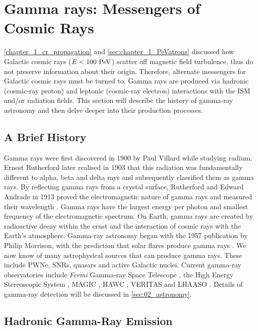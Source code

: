 \section{Gamma rays: Messengers of Cosmic Rays} \label
{sec:chapter1_non_thermal_emission}
\autoref{chapter_1_cr_propagation} and \autoref{sec:chapter_1_PeVatrons} discussed how Galactic cosmic rays ($E<100~\PeV$) scatter off magnetic field turbulence, thus do not preserve information about their origin. Therefore, alternate messengers for Galactic cosmic rays must be turned to. Gamma rays are produced via hadronic (cosmic-ray proton) and leptonic (cosmic-ray electron) interactions with the ISM and/or radiation fields. This section will describe the history of gamma-ray astronomy and then delve deeper into their production processes.

\subsection{A Brief History}

Gamma rays were first discovered in 1900 by Paul Villard while studying radium. Ernest Rutherford later realised in 1903 that this radiation was fundamentally different to alpha, beta and delta rays and subsequently classified them as gamma rays. By reflecting gamma rays from a crystal surface, Rutherford and Edward Andrade in 1913 proved the electromagnetic nature of gamma rays and measured their wavelength \citep{1913Natur..92..267R}. Gamma rays have the largest energy per photon and smallest frequency of the electromagnetic spectrum. On Earth, gamma rays are created by radioactive decay within the crust and the interaction of cosmic rays with the Earth's atmosphere. Gamma-ray astronomy began with the 1957 publication by Philip Morrison, with the prediction that solar flares produce gamma rays \citep{1958NCim....7..858M}. We now know of many astrophysical sources that can produce gamma rays. These include PWNe, SNRs, quasars and active Galactic nuclei. Current gamma-ray observatories include \textit{Fermi} Gamma-ray Space Telescope \citep{nasa_fermi_site}, the High Energy Stereoscopic System \citep{HESS}, MAGIC \citep{MAGIC}, HAWC \citep{HAWC}, VERITAS \citep{VERITAS} and LHAASO \citep{LHAASO_website}. Details of gamma-ray detection will be discussed in \autoref{sec:02_astronomy}.

\subsection{Hadronic Gamma-Ray Emission} \label{sec:chapter1_hadronic_gr_emission}

